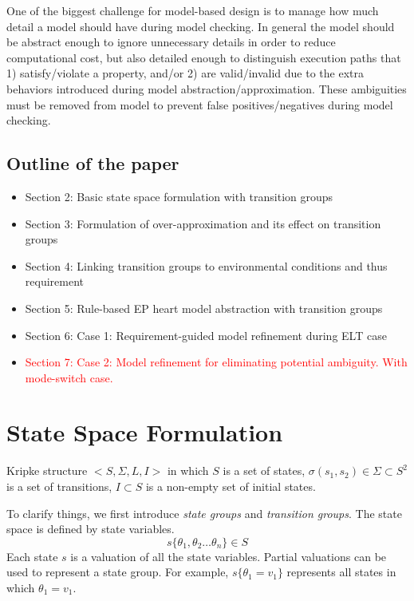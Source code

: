 \documentclass{llncs}
\begin{document}

One of the biggest challenge for model-based design is to manage how much detail a model should have during model checking. In general the model should be abstract enough to ignore unnecessary details in order to reduce computational cost, but also detailed enough to distinguish execution paths that 1) satisfy/violate a property, and/or 2) are valid/invalid due to the extra behaviors introduced during model abstraction/approximation. These ambiguities must be removed from model to prevent false positives/negatives during model checking. 

\subsection{Outline of the paper}
\begin{itemize}
	\item Section 2: Basic state space formulation with transition groups
    \item Section 3: Formulation of over-approximation and its effect on transition groups
    \item Section 4: Linking transition groups to environmental conditions and thus requirement
    \item Section 5: Rule-based EP heart model abstraction with transition groups
    \item Section 6: Case 1: Requirement-guided model refinement during ELT case 
    \item\textcolor{red}{ Section 7: Case 2: Model refinement for eliminating potential ambiguity. With mode-switch case.} 
\end{itemize}

%
%

\section{State Space Formulation}
Kripke structure $<S,\Sigma,L,I>$ in which $S$ is a set of states, $\sigma(s_1,s_2)\in\Sigma\subset S^2$ is a set of transitions, $I\subset S$ is a non-empty set of initial states.

To clarify things, we first introduce \emph{state groups} and \emph{transition groups}. The state space is defined by state variables. 
$$s\{\theta_1,\theta_2\dots \theta_n\}\in S$$
Each state $s$ is a valuation of all the state variables. Partial valuations can be used to represent a state group. For example, $s\{\theta_1=v_1\}$ represents all states in which $\theta_1=v_1$.
\end{document}
